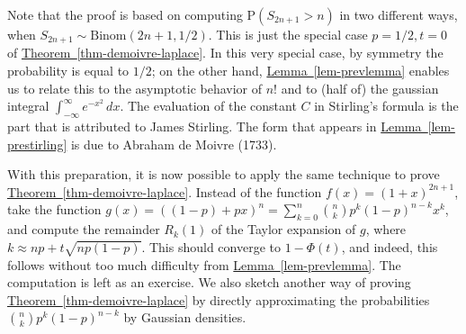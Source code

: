 \documentclass[11pt]{report}
\theoremstyle{plain}
\theoremstyle{definition}
\begin{document}
\noindent Note that the proof is based on computing
$\mathrm{P}(S_{2n+1} > n)$ in two different ways,
when $S_{2n+1}\sim \textrm{Binom}(2n+1,1/2)$. This is
just the special case $p=1/2, t=0$ of \texorpdfstring{\hyperref[thm-demoivre-laplace]{Theorem~\ref*{thm-demoivre-laplace}}}{Theorem}. In this very special case, by
symmetry the probability is equal to $1/2$; on the
other hand, \hyperref[lem-prevlemma]{Lemma~\ref*{lem-prevlemma}} enables us to relate
this to the asymptotic behavior of $n!$ and to (half
of) the gaussian integral
$\int_{-\infty}^\infty e^{-x^2}\,dx$. The evaluation
of the constant $C$ in Stirling's formula is the part
that is attributed to James Stirling. The form that
appears in \hyperref[lem-prestirling]{Lemma~\ref*{lem-prestirling}} is due to Abraham
de Moivre (1733).

With this preparation, it is now possible to apply
the same technique to prove \texorpdfstring{\hyperref[thm-demoivre-laplace]{Theorem~\ref*{thm-demoivre-laplace}}}{Theorem}. Instead of the function
$f(x)=(1+x)^{2n+1}$, take the function
$g(x)=((1-p) + p x)^n=\sum_{k=0}^n \binom{n}{k} p^k
(1-p)^{n-k} x^k$,
and compute the remainder $R_k(1)$ of the Taylor
expansion of $g$, where
$k \approx np + t \sqrt{np(1-p)}$. This should
converge to $1-\Phi(t)$, and indeed, this follows
without too much difficulty from \texorpdfstring{\hyperref[lem-prevlemma]{Lemma~\ref*{lem-prevlemma}}}{Lemma}. The computation is left as an
exercise. We also sketch another way of proving
\hyperref[thm-demoivre-laplace]{Theorem~\ref*{thm-demoivre-laplace}} by directly
approximating the probabilities
$\binom{n}{k} p^k (1-p)^{n-k}$ by Gaussian densities.
\end{document}

